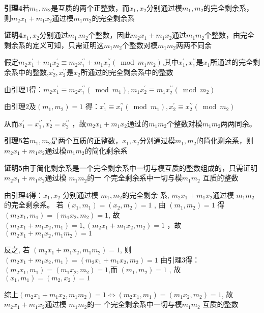 \documentclass[a4paper,12pt]{article}
\begin{document}
\textbf{引理4}\quad 若$m_1,m_2$是互质的两个正整数，而$x_1,x_2$分别通过模$m_1,m_2$的完全剩余系，则$m_2x_1+m_1x_2$通过模$m_1m_2$的完全剩余系\par
\textbf{证明4}\quad $x_1,x_2$分别通过$m_1.m_2$个整数，因此$m_2x_1+m_1x_2$通过$m_1m_2$个整数，由完全剩余系的定义可知，只需证明这$m_1m_2$个整数对模$m_1m_2$两两不同余\par 
假定$m_{2} x_{1}^{\prime}+m_{1} x_{2}^{\prime} \equiv m_{2} x_{1}^{\prime \prime}+m_{1} x_{2}^{\prime \prime}\left(\bmod m_{1} m_{2}\right)$,其中$x_{1}^{\prime}, x_{1}^{\prime \prime}$是$x_{1}$所通过的完全剩余系中的整数,$x_{2}^{\prime}, x_{2}^{\prime \prime}$是$x_2$所通过的完全剩余系中的整数\par 
由引理1得：$m_{2} x_{1}^{\prime} \equiv m_{2} x_{1}^{\prime \prime}\left(\bmod m_{1}\right), m_{1} x_{2}^{\prime} \equiv m_{1} x_{2}^{\prime \prime}\left(\bmod m_{2}\right) $\par 
由引理2及$\left(m_{1}, m_{2}\right)=1$  得：$  x_{1}^{\prime} \equiv x_{1}^{\prime \prime}\left(\bmod m_{1}\right), x_{2}^{\prime} \equiv x_{2}^{\prime \prime}   \left(\bmod m_{2}\right) $\par 从而$x_{1}^{\prime}=x_{1}^{\prime \prime}, x_{2}^{\prime}=x_{2}^{\prime \prime}$ ，故$m_2x_1+m_1x_2$通过的$m_1m_2$个整数对模$m_1m_2$两两同余。\par

\textbf{引理5}\quad 若$m_1,m_2$是两个互质的正整数，$x_1,x_2$分别通过模$m_1,m_2$的简化剩余系，则$m_2x_1+m_1x_2$通过模$m_1m_2$的简化剩余系\par
\textbf{证明5}\quad 由于简化剩余系是一个完全剩余系中一切与模互质的整数组成的，只需证明 $ m_{2} x_{1}+m_{1} x_{2}  $通过模 $ m_{1} m_{2}  $的一 个完全剩余系中一切与模$  m_{1} m_{2} $ 互质的整数\par
由引理4得：$x_{1}, x_{2} $ 分别通过模 $ m_{1}, m_{2}  $的完全剩余 系, $ m_{2} x_{1}+m_{1} x_{2}  $通过模 $ m_{1} m_{2} $ 的完全剩余系。 若 $ \left(x_{1}, m_{1}\right)  = \left(x_{2}, m_{2}\right)=1$ , 由 $ \left(m_{1}, m_{2}\right)=1 $ 得 $ \left(m_{2} x_{1}, m_{1}\right)=\left(m_{1} x_{2}\right. ,  \left.m_{2}\right)=1 $, 故  $\left(m_{2} x_{1}+m_{1} x_{2}, m_{1}\right)=1,\left(m_{2} x_{1}+m_{1} x_{2}, m_{2}\right)=1$ ，故$ \left(m_{2} x_{1}+m_{1} x_{2}, m_{1} m_{2}\right)=1 $\par  
反之, 若 $ \left(m_{2} x_{1}+m_{1} x_{2}, m_{1} m_{2}\right)=1 $, 则$  \left(m_{2} x_{1}+m_{1} x_{2}, m_{1}\right)=\left(m_{2} x_{1}+m_{1} x_{2}, m_{2}\right)=1$ 由引理3得：$  \left(m_{2} x_{1}, m_{1}\right)=\left(m_{1} x_{2}, m_{2}\right)=1 $,而 $\left(m_{1}, m_{2}\right)=1$ , 故 $ \left(x_{1}\right. ,  \left.m_{1}\right)=\left(m_{2}, x_{2}\right)=1$ \par 
综上$ \left(m_{2} x_{1}+m_{1} x_{2}, m_{1} m_{2}\right)=1 \iff \left(m_{2} x_{1}, m_{1}\right)=\left(m_{1} x_{2}\right. ,  \left.m_{2}\right)=1 $, 故   $ m_{2} x_{1}+m_{1} x_{2}  $通过模 $ m_{1} m_{2}  $的一 个完全剩余系中一切与模$  m_{1} m_{2} $ 互质的整数\par 
\end{document}
